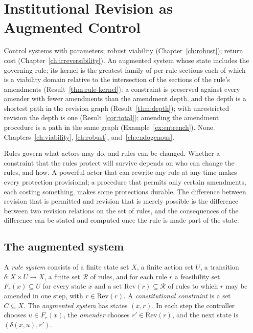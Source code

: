 \chapter{Institutional Revision as Augmented Control}\label{ch:revision}
{Control systems with parameters; robust viability (Chapter~\ref{ch:robust}); return cost (Chapter~\ref{ch:irreversibility}).}
{An augmented system whose state includes the governing rule; its kernel is the greatest family of per-rule sections each of which is a viability domain relative to the intersection of the sections of the rule's amendments (Result~\ref{thm:rule-kernel}); a constraint is preserved against every amender with fewer amendments than the amendment depth, and the depth is a shortest path in the revision graph (Result~\ref{thm:depth}); with unrestricted revision the depth is one (Result~\ref{cor:total}); amending the amendment procedure is a path in the same graph (Example~\ref{ex:entrench}).}
{None.}
{Chapters~\ref{ch:viability}, \ref{ch:robust}, and~\ref{ch:endogenous}.}

Rules govern what actors may do, and rules can be changed. Whether a constraint that the rules protect will survive depends on who can change the rules, and how. A powerful actor that can rewrite any rule at any time makes every protection provisional; a procedure that permits only certain amendments, each costing something, makes some protections durable. The difference between revision that is permitted and revision that is merely possible is the difference between two revision relations on the set of rules, and the consequences of the difference can be stated and computed once the rule is made part of the state.

\section{The augmented system}

\begin{definition}\label{def:rule-system}
A \emph{rule system} consists of a finite state set $X$, a finite action set $U$, a transition $\delta:X\times U\to X$, a finite set $\mathcal R$ of rules, and for each rule $r$ a feasibility set $F_r(x)\subseteq U$ for every state $x$ and a set $\mathrm{Rev}(r)\subseteq\mathcal R$ of rules to which $r$ may be amended in one step, with $r\in\mathrm{Rev}(r)$. A \emph{constitutional constraint} is a set $C\subseteq X$. The \emph{augmented system} has states $(x,r)$. In each step the controller chooses $u\in F_r(x)$, the \emph{amender} chooses $r'\in\mathrm{Rev}(r)$, and the next state is $(\delta(x,u),r')$.
\end{definition}

